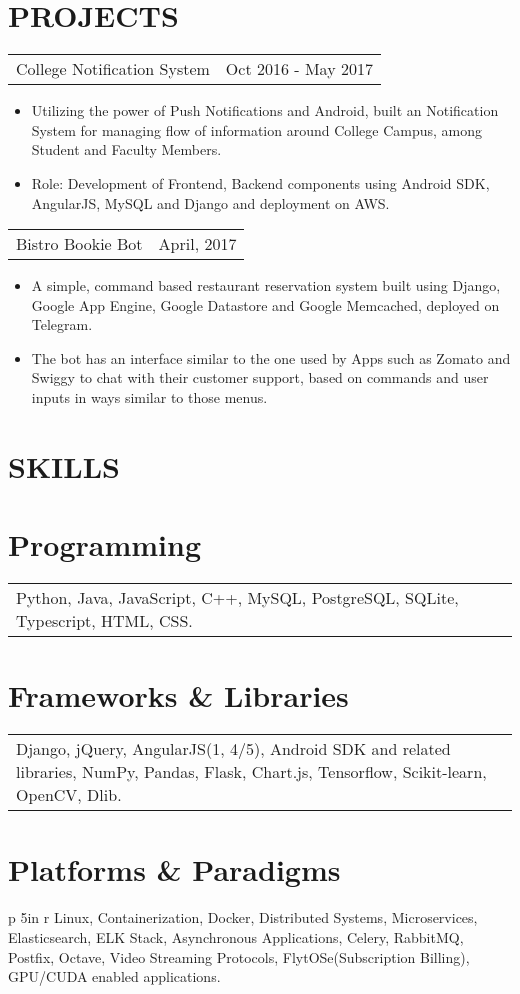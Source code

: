 \documentclass[margin]{res}
\begin{document}
\begin{resume}
\section{PROJECTS}
		 \begin{tabular}{p{3.6in} r} %
     College Notification System & Oct 2016 - May 2017
     \end{tabular}
      \begin{itemize}
       \item[] Utilizing the power of Push Notifications and Android, built an Notification System for managing flow of information around College Campus, among Student and Faculty Members.
       \item[] Role: Development of Frontend, Backend components using Android SDK, AngularJS, MySQL and Django and deployment on AWS.
      \end{itemize}
		\begin{tabular}{p{4.2in}r}
		 Bistro Bookie Bot & April, 2017
		 \end{tabular}
		  \begin{itemize}
		   \item[] A simple, command based restaurant reservation system built using Django, Google App Engine, Google Datastore and Google Memcached, deployed on Telegram.
		   \item[] The bot has an interface similar to the one used by Apps such as Zomato and Swiggy to chat with their customer support, based on commands and user inputs in ways similar to those menus.
		  \end{itemize}
\section{SKILLS}
\normalsize{\section{Programming}}
         \begin{tabular}{p{5in} r}
         Python, Java, JavaScript, C++, MySQL, PostgreSQL, SQLite, Typescript, HTML, CSS.
         \end{tabular}
\normalsize{\section{Frameworks \& Libraries}}
         \begin{tabular}{p{5in} r}
          Django, jQuery, AngularJS(1, 4/5), Android SDK and related libraries, NumPy, Pandas, Flask, Chart.js, Tensorflow, Scikit-learn, OpenCV, Dlib.
          \end{tabular}
\normalsize{\section{Platforms \& Paradigms}}
         \begin{tabular}{p {5in} r}
           Linux, Containerization, Docker, Distributed Systems, Microservices, Elasticsearch, ELK Stack, Asynchronous Applications, Celery, RabbitMQ, Postfix, Octave, Video Streaming Protocols, FlytOSe(Subscription Billing), GPU/CUDA enabled applications.
         \end{tabular}

\end{resume}
\end{document}
